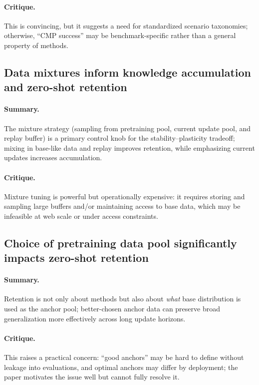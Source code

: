 \documentclass[12pt]{article}
\begin{document}
\paragraph{Critique.} This is convincing, but it suggests a need for standardized scenario taxonomies;
otherwise, “CMP success” may be benchmark-specific rather than a general property of methods.

\subsection{Data mixtures inform knowledge accumulation and zero-shot retention}
\paragraph{Summary.} The mixture strategy (sampling from pretraining pool, current update pool, and replay
buffer) is a primary control knob for the stability--plasticity tradeoff; mixing in base-like data and replay
improves retention, while emphasizing current updates increases accumulation.
\paragraph{Critique.} Mixture tuning is powerful but operationally expensive: it requires storing and
sampling large buffers and/or maintaining access to base data, which may be infeasible at web scale or under
access constraints.

\subsection{Choice of pretraining data pool significantly impacts zero-shot retention}
\paragraph{Summary.} Retention is not only about methods but also about \emph{what} base distribution is used
as the anchor pool; better-chosen anchor data can preserve broad generalization more effectively across long
update horizons.
\paragraph{Critique.} This raises a practical concern: “good anchors” may be hard to define without leakage
into evaluations, and optimal anchors may differ by deployment; the paper motivates the issue well but cannot
fully resolve it.
\end{document}
